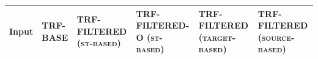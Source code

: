\documentclass[11pt,a4paper]{article}
\begin{document}
\begin{table}[!ht]
\begin{tabular}
		
	\end{tabular}
	\caption{Responses to high entropy inputs. Training name explanation: TRF refers to the \texttt{transformer} model, and the \textit{O} notation means that it is an overfitted version. \textsc{base} and \textsc{filtered} mean that the model is trained on unfiltered and filtered data, respectively. The filtering strategies are noted in parenthesis.}
	\label{table:icp_filtered_compare}
\end{table}

\begin{table}[!ht]
	\fontsize{8}{12}\selectfont
	\renewcommand{\arraystretch}{0.55}
	
	\centering
	\begin{tabular}{
			>{\setlength{\baselineskip}{0.01\baselineskip}}p{2.1cm}
			>{\setlength{\baselineskip}{0.01\baselineskip}}p{2cm}
			>{\setlength{\baselineskip}{0.01\baselineskip}}p{2.5cm}
			>{\setlength{\baselineskip}{0.01\baselineskip}}p{2.1cm}
			>{\setlength{\baselineskip}{0.01\baselineskip}}p{2.1cm}
			>{\setlength{\baselineskip}{0.01\baselineskip}}p{2.2cm}}
		\textbf{Input} & \textbf{TRF-BASE} & \textbf{TRF-FILTERED (\textsc{st-based})} & \textbf{TRF-FILTERED-O (\textsc{st-based})} & \textbf{TRF-FILTERED (\textsc{target-based})} & \textbf{TRF-FILTERED (\textsc{source-based})} \\ \hline
		

\end{tabular}
\end{table}
\end{document}
